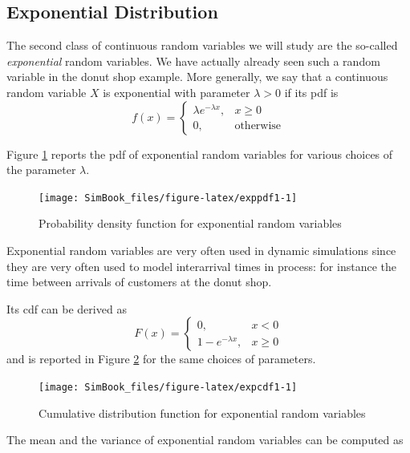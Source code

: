 \documentclass[
]{book}
\begin{document}
\hypertarget{exponential-distribution}{%
\subsection{Exponential Distribution}\label{exponential-distribution}}

The second class of continuous random variables we will study are the so-called \emph{exponential} random variables. We have actually already seen such a random variable in the donut shop example. More generally, we say that a continuous random variable \(X\) is exponential with parameter \(\lambda>0\) if its pdf is
\[
f(x) = \left\{
\begin{array}{ll}
\lambda e^{-\lambda x}, & x\geq 0\\
0, & \mbox{otherwise}
\end{array}
\right.
\]

Figure \ref{fig:exppdf1} reports the pdf of exponential random variables for various choices of the parameter \(\lambda\).

\begin{figure}

{\centering \texttt{[image: SimBook\_files/figure-latex/exppdf1-1]} 

}

\caption{Probability density function for exponential random variables}\label{fig:exppdf1}
\end{figure}

Exponential random variables are very often used in dynamic simulations since they are very often used to model interarrival times in process: for instance the time between arrivals of customers at the donut shop.

Its cdf can be derived as
\[
F(x)=\left\{
\begin{array}{ll}
0, & x <0\\
1-e^{-\lambda x}, & x\geq 0
\end{array}
\right.
\]
and is reported in Figure \ref{fig:expcdf1} for the same choices of parameters.

\begin{figure}

{\centering \texttt{[image: SimBook\_files/figure-latex/expcdf1-1]} 

}

\caption{Cumulative distribution function for exponential random variables}\label{fig:expcdf1}
\end{figure}

The mean and the variance of exponential random variables can be computed as
\end{document}
